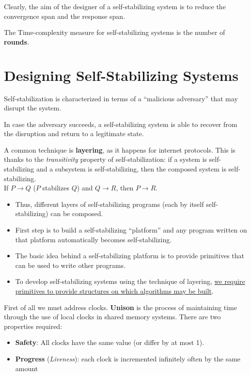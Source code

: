 Clearly, the aim of the designer of a self-stabilizing system is to reduce the convergence span and the response span.

The Time-complexity measure for self-stabilizing systems is the number of \textbf{rounds}.


\section{Designing Self-Stabilizing Systems}
Self-stabilization is characterized in terms of a ``malicious adversary''  that may disrupt the system.

In case the adversary succeeds, a self-stabilizing system is able to recover from the disruption and return to a legitimate state.
\nl


A common technique is \textbf{layering}, as it happens for internet protocols.
This is thanks to the \textit{transitivity} property of self-stabilization: if a system is self-stabilizing and a subsystem is self-stabilizing, then the composed system is self-stabilizing.\\
If $P \rightarrow Q$ ($P$ stabilizes $Q$) and $Q \rightarrow R$, then $P \rightarrow R$.
\begin{itemize}
	\item Thus, different layers of self-stabilizing programs (each by itself self-stabilizing) can be composed.
	\item First step is to build a self-stabilizing ``platform'' and any program written on that platform automatically
becomes self-stabilizing.
	\item The basic idea behind a self-stabilizing platform is to provide primitives that can be used to write other
programs.
	\item To develop self-stabilizing systems using the technique of layering, \ul{we require primitives to provide
structures on which algorithms may be built}.
\end{itemize}

First of all we must address clocks.
\textbf{Unison} is the process of maintaining time through the use of local clocks in shared memory systems.
There are two properties required:
\begin{itemize}
   \item \textbf{Safety}: All clocks have the same value (or differ by at most 1). 
   \item \textbf{Progress} (\textit{Liveness}): each clock is incremented infinitely often by the same amount
\end{itemize}

